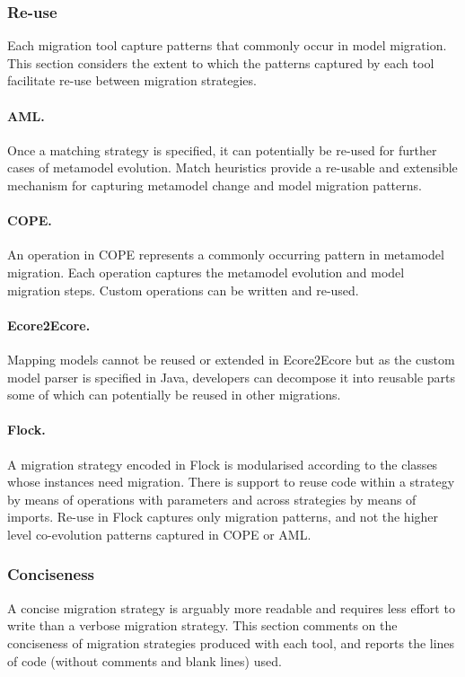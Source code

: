 \subsubsection{Re-use}
Each migration tool capture patterns that commonly occur in model migration. This section considers the extent to which the patterns captured by each tool facilitate re-use between migration strategies.

\paragraph{AML.} Once a matching strategy is specified, it can potentially be re-used for further cases of metamodel evolution. Match heuristics provide a re-usable and extensible mechanism for capturing metamodel change and model migration patterns.

\paragraph{COPE.} An operation in COPE represents a commonly occurring pattern in metamodel migration. Each operation captures the metamodel evolution and model migration steps. Custom operations can be written and re-used.

\paragraph{Ecore2Ecore.} Mapping models cannot be reused or extended in Ecore2Ecore but as the custom model parser is specified in Java, developers can decompose it into reusable parts some of which can potentially be reused in other migrations.

\paragraph{Flock.} A migration strategy encoded in Flock is modularised according to the classes whose instances need migration. There is support to reuse code within a strategy by means of operations with parameters and across strategies by means of imports. Re-use in Flock captures only migration patterns, and not the higher level co-evolution patterns captured in COPE or AML.



\subsubsection{Conciseness}
A concise migration strategy is arguably more readable and requires less effort to write than a verbose migration strategy. This section comments on the conciseness of migration strategies produced with each tool, and reports the lines of code (without comments and blank lines) used.

